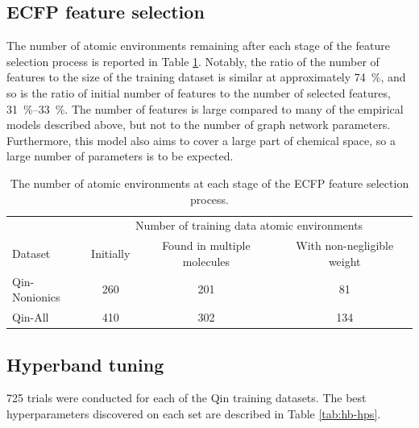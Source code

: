 \subsection{ECFP feature selection}

The number of atomic environments remaining after each stage of the feature
selection process is reported in Table \ref{tab:ecfp-fs}. Notably, the ratio of
the number of features to the size of the training dataset is similar at
approximately \SI{74}{\%}, and so is the ratio of initial number of features to
the number of selected features, \SIrange{31}{33}{\%}. The number of features is
large compared to many of the empirical models described above, but not to the
number of graph network parameters. Furthermore, this model also aims to cover a
large part of chemical space, so a large number of parameters is to be expected.

\begin{table}
    \centering
    \caption{The number of atomic environments at each stage of the ECFP feature selection process.}
    \label{tab:ecfp-fs}
    \begin{tabular}{@{}lccc@{}} \toprule
                      & \multicolumn{3}{c}{Number of training data atomic environments}                                                            \\\cmidrule(l){2-4}
        Dataset       & Initially                                                       & Found in multiple molecules & With non-negligible weight \\\midrule
        Qin-Nonionics & 260                                                             & 201                         & 81                         \\
        Qin-All       & 410                                                             & 302                         & 134                        \\\bottomrule
    \end{tabular}
\end{table}

\subsection{Hyperband tuning}

\num{725} trials were conducted for each of the Qin training datasets. The best
hyperparameters discovered on each set are described in Table \ref{tab:hb-hps}.


